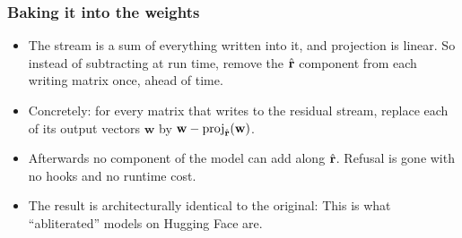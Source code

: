 \begin{frame}
\frametitle{Baking it into the weights}
\begin{itemize}
    \item The stream is a sum of everything written into it, and projection is
    linear. So instead of subtracting at run time, remove the $\hat{\mathbf{r}}$ component
    from each writing matrix once, ahead of time.
    \item Concretely: for every matrix that writes to the residual stream,
    replace each of its output vectors $\mathbf{w}$ by
    $\mathbf{w} - \operatorname{proj}_{\hat{\mathbf{r}}}\!\left(\mathbf{w}\right)$.
    \item Afterwards no component of the model can add along $\hat{\mathbf{r}}$. Refusal
    is gone with no hooks and no runtime cost.
    \item The result is architecturally identical to the original: This is what
    ``abliterated'' models on Hugging Face are.
\end{itemize}
\end{frame}


